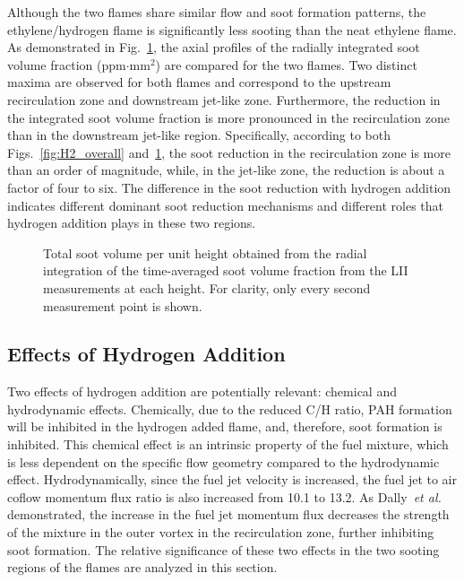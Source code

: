 Although the two flames share similar flow and soot formation patterns, the ethylene/hydrogen flame is significantly less sooting than the neat ethylene flame.  As demonstrated in Fig.~\ref{fig:ifv}, the axial profiles of the radially integrated soot volume fraction (ppm$\cdot$mm$^2$) are compared for the two flames.  Two distinct maxima are observed for both flames and correspond to the upstream recirculation zone and downstream jet-like zone.  Furthermore, the reduction in the integrated soot volume fraction is more pronounced in the recirculation zone than in the downstream jet-like region.  Specifically, according to both Figs.~\ref{fig:H2_overall} and~\ref{fig:ifv}, the soot reduction in the recirculation zone is more than an order of magnitude, while, in the jet-like zone, the reduction is about a factor of four to six.  The difference in the soot reduction with hydrogen addition indicates different dominant soot reduction mechanisms and different roles that hydrogen addition plays in these two regions.  

\begin{figure}[t]
  \centering
  \scriptsize
  \resizebox{0.7\textwidth}{!}{}
  \normalsize
  \caption{Total soot volume per unit height obtained from the radial integration of the time-averaged soot volume fraction from the LII measurements at each height.  For clarity, only every second measurement point is shown.}
  \label{fig:ifv}
\end{figure}

\subsection{Effects of Hydrogen Addition}

Two effects of hydrogen addition are potentially relevant: chemical and hydrodynamic effects.  Chemically, due to the reduced C/H ratio, PAH formation will be inhibited in the hydrogen added flame, and, therefore, soot formation is inhibited.  This chemical effect is an intrinsic property of the fuel mixture, which is less dependent on the specific flow geometry compared to the hydrodynamic effect.  Hydrodynamically, since the fuel jet velocity is increased, the fuel jet to air coflow momentum flux ratio is also increased from 10.1 to 13.2.  As Dally~\emph{et al.}~\cite{dally98b} demonstrated, the increase in the fuel jet momentum flux decreases the strength of the mixture in the outer vortex in the recirculation zone, further inhibiting soot formation.  The relative significance of these two effects in the two sooting regions of the flames are analyzed in this section.


